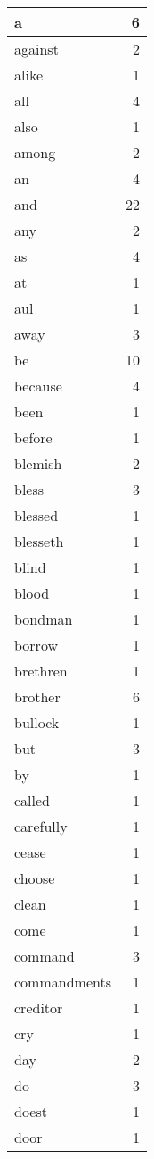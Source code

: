 \begin{center}
\begin{longtable}{l|r}
a & 6 \\ \hline
against & 2 \\ \hline
alike & 1 \\ \hline
all & 4 \\ \hline
also & 1 \\ \hline
among & 2 \\ \hline
an & 4 \\ \hline
and & 22 \\ \hline
any & 2 \\ \hline
as & 4 \\ \hline
at & 1 \\ \hline
aul & 1 \\ \hline
away & 3 \\ \hline
be & 10 \\ \hline
because & 4 \\ \hline
been & 1 \\ \hline
before & 1 \\ \hline
blemish & 2 \\ \hline
bless & 3 \\ \hline
blessed & 1 \\ \hline
blesseth & 1 \\ \hline
blind & 1 \\ \hline
blood & 1 \\ \hline
bondman & 1 \\ \hline
borrow & 1 \\ \hline
brethren & 1 \\ \hline
brother & 6 \\ \hline
bullock & 1 \\ \hline
but & 3 \\ \hline
by & 1 \\ \hline
called & 1 \\ \hline
carefully & 1 \\ \hline
cease & 1 \\ \hline
choose & 1 \\ \hline
clean & 1 \\ \hline
come & 1 \\ \hline
command & 3 \\ \hline
commandments & 1 \\ \hline
creditor & 1 \\ \hline
cry & 1 \\ \hline
day & 2 \\ \hline
do & 3 \\ \hline
doest & 1 \\ \hline
door & 1 \\ \hline

\end{longtable}
\end{center}
